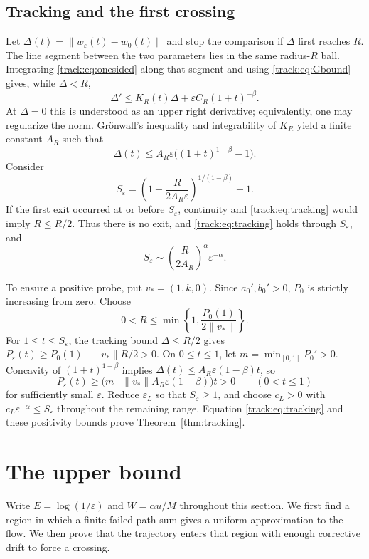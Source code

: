 \documentclass[11pt]{article}
\newcommand{\eps}{\varepsilon}\newcommand{\R}{\mathbb R}
\begin{document}
\subsection{Tracking and the first crossing}
Let $\Delta(t)=\|w_\eps(t)-w_0(t)\|$ and stop the comparison if $\Delta$ first
reaches $R$. The line segment between the two parameters lies in the same
radius-$R$ ball. Integrating \eqref{track:eq:onesided} along that segment and
using \eqref{track:eq:Gbound} gives, while $\Delta<R$,
\[
 \Delta'\le K_R(t)\Delta+\eps C_R(1+t)^{-\beta}.
\]
At $\Delta=0$ this is understood as an upper right derivative; equivalently,
one may regularize the norm. Gr\"onwall's inequality and integrability of
$K_R$ yield a finite constant $A_R$ such that
\begin{equation}\label{track:eq:tracking}
 \Delta(t)\le A_R\eps\bigl((1+t)^{1-\beta}-1\bigr).
\end{equation}
Consider
\[
 S_\eps=\left(1+\frac{R}{2A_R\eps}\right)^{1/(1-\beta)}-1.
\]
If the first exit occurred at or before $S_\eps$, continuity and
\eqref{track:eq:tracking} would imply $R\le R/2$. Thus there is no exit, and
\eqref{track:eq:tracking} holds through $S_\eps$, and
\[
 S_\eps\sim\left(\frac{R}{2A_R}\right)^\alpha\eps^{-\alpha}.
\]

To ensure a positive probe, put $v_*=(1,k,0)$. Since $a_0',b_0'>0$,
$P_0$ is strictly increasing from zero. Choose
\[
 0<R\le\min\left\{1,\frac{P_0(1)}{2\|v_*\|}\right\}.
\]
For $1\le t\le S_\eps$, the tracking bound $\Delta\le R/2$ gives
$P_\eps(t)\ge P_0(1)-\|v_*\|R/2>0$.
On $0\le t\le1$, let $m=\min_{[0,1]}P_0'>0$.
Concavity of $(1+t)^{1-\beta}$ implies
$\Delta(t)\le A_R\eps(1-\beta)t$, so
\[
 P_\eps(t)\ge
 \bigl(m-\|v_*\|A_R\eps(1-\beta)\bigr)t>0\qquad(0<t\le1)
\]
for sufficiently small $\eps$. Reduce $\eps_L$ so that $S_\eps\ge1$,
and choose $c_L>0$ with $c_L\eps^{-\alpha}\le S_\eps$ throughout the
remaining range. Equation \eqref{track:eq:tracking} and these positivity bounds
prove Theorem~\ref{thm:tracking}.


\section{The upper bound}
Write $E=\log(1/\eps)$ and $W=\alpha u/M$ throughout this section.
We first find a region in which a finite failed-path sum gives a uniform
approximation to the flow. We then prove that the trajectory enters that
region with enough corrective drift to force a crossing.
\end{document}
